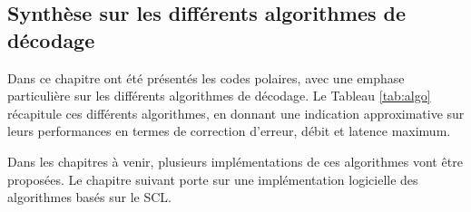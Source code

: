 \subsection{Synthèse sur les différents algorithmes de décodage}
 Dans ce chapitre ont été présentés les codes polaires, avec une emphase particulière sur les différents algorithmes de décodage. Le Tableau \ref{tab:algo} récapitule ces différents algorithmes, en donnant une indication approximative sur leurs performances en termes de correction d'erreur, débit et latence maximum.
  \begin{table}[htp]
    \centering
    \caption{Tendances des différents algorithmes concernant leurs pouvoirs de correction, débits et latences.}
    \label{tab:algo}
    {\small{}}
  \end{table}


Dans les chapitres à venir, plusieurs implémentations de ces algorithmes vont être proposées. Le chapitre suivant porte sur une implémentation logicielle des algorithmes basés sur le SCL.
